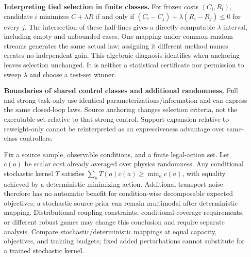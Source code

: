 \textbf{Interpreting tied selection in finite classes.} For frozen costs $(C_i,R_i)$, candidate $i$
minimizes $C+\lambda R$ if and only if
$(C_i-C_j)+\lambda(R_i-R_j)\le0$ for every $j$.
The intersection of these half-lines gives a directly computable $\lambda$ interval, including empty and unbounded cases.
One mapping under common random streams generates the same actual law; assigning it different method names creates
no independent gain. This algebraic diagnosis identifies when anchoring leaves selection unchanged. It is neither a statistical certificate
nor permission to sweep $\lambda$ and choose a test-set winner.

\textbf{Boundaries of shared control classes and additional randomness.} Full and strong task-only use
identical parameterizations/information and can express the same closed-loop laws. Source anchoring changes
selection criteria, not the executable set relative to that strong control. Support expansion relative to reweight-only
cannot be reinterpreted as an expressiveness advantage over same-class controllers.

Fix a source sample, observable conditions, and a finite legal-action set. Let $c(a)$ be scalar cost already averaged over
physics randomness. Any conditional stochastic kernel $T$ satisfies
$\sum_a T(a)c(a)\ge\min_a c(a)$, with equality achieved by a deterministic minimizing action.
Additional transport noise therefore has no automatic benefit for condition-wise decomposable expected objectives;
a stochastic source prior can remain multimodal after deterministic mapping. Distributional coupling constraints, conditional-coverage requirements,
or different robust games may change this conclusion and require separate analysis. Compare stochastic/deterministic mappings
at equal capacity, objectives, and training budgets; fixed added perturbations cannot substitute for a trained stochastic kernel.
